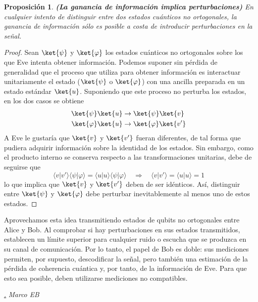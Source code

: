 \documentclass[a4paper,11pt]{book} %
\newtheorem{proposicion_contador}{Proposición}
\newcommand{\Proposicion}[1]{
		\begin{mybox_gray2}{}
			\begin{proposicion_contador}
				 #1 
			\end{proposicion_contador} 
		\end{mybox_gray2}
	}
\numberwithin{equation}{chapter}
\newcommand{\braket}[2]{\langle #1|#2\rangle}
\def\rqa{\quad \Rightarrow \quad}
\def\subsubiContadorIt{\par\addtocounter{subsubsection}{1}\underline{\it\thesubsubsection.}\hskip0.5cm \setcounter{subsubsubsectionIt}{0}}
\newcommand{\SubsubiIt}[1]{
		\subsubiContadorIt \textit{#1}
	}
\newcounter{subsubsubsectionIt}[subsubsection]
\begin{document}
	\Proposicion{\textbf{(La ganancia de información implica perturbaciones)} En cualquier intento de distinguir entre dos estados cuánticos no ortogonales, la ganancia de información sólo es posible a costa de introducir perturbaciones en la señal.}

	\begin{proof}
	Sean $\ket{\psi}$ y $\ket{\varphi}$ los estados cuánticos no ortogonales sobre los que Eve intenta obtener información. Podemos suponer sin pérdida de generalidad que el proceso que utiliza para obtener información es interactuar unitariamente el estado ($\ket{\psi}$ o $\ket{\varphi}$) con una ancilla preparada en un estado estándar $\ket{u}$. Suponiendo que este proceso no perturba los estados, en los dos casos se obtiene
	\begin{align}
	\ket{\psi} \ket{u} & \rightarrow \ket{\psi} \ket{v} \\
	\ket{\varphi} \ket{u} & \rightarrow \ket{\varphi} \ket{v'}
	\end{align}
	A Eve le gustaría que $\ket{v}$ y $\ket{v'}$ fueran diferentes, de tal forma que pudiera adquirir información sobre la identidad de los estados. Sin embargo, como el producto interno se conserva respecto a las transformaciones unitarias, debe de seguirse que
	\begin{equation}
	\braket{v}{v'} \braket{\psi}{\varphi} = \braket{u}{u} \braket{\psi}{\varphi} \rqa \braket{v}{v'} = \braket{u}{u} = 1	
	\end{equation}
	lo que implica que $\ket{v}$ y $\ket{v'}$ deben de ser idénticos. Así, distinguir entre $\ket{\psi}$ y $\ket{\varphi}$ debe perturbar inevitablemente al menos uno de estos estados.
	\end{proof}
Aprovechamos esta idea transmitiendo estados de qubits no ortogonales entre Alice y Bob. Al comprobar si hay perturbaciones en sus estados transmitidos, establecen un límite superior para cualquier ruido o escucha que se produzca en su canal de comunicación. Por lo tanto, el papel de Bob es doble: sus mediciones permiten, por supuesto, descodificar la señal, pero también una estimación de la pérdida de coherencia cuántica y, por tanto, de la información de Eve. Para que esto sea posible, deben utilizarse mediciones no compatibles.

			\SubsubiIt{Marco EB}
\end{document}
